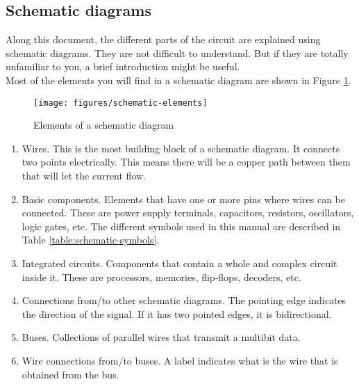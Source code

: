 \subsection{Schematic diagrams}

Along this document, the different parts of the circuit are explained using schematic diagrams. They are not difficult to understand. But if they are totally unfamiliar to you, a brief introduction might be useful. \\

Most of the elements you will find in a schematic diagram are shown in Figure \ref{fig:schematic-elements}.\\

\begin{figure}[h]
	\centering
	\texttt{[image: figures/schematic-elements]}
	\caption{Elements of a schematic diagram}
	\label{fig:schematic-elements}
\end{figure}

\begin{enumerate}
	\item Wires. This is the most building block of a schematic diagram. It connects two points electrically. This means there will be a copper path between them that will let the current flow. 
	\item Basic components. Elements that have one or more pins where wires can be connected. These are power supply terminals, capacitors, resistors, oscillators, logic gates, etc. The different symbols used in this manual are described in Table \ref{table:schematic-symbols}. 
	\item Integrated circuits. Components that contain a whole and complex circuit inside it. These are processors, memories, flip-flops, decoders, etc. 
	\item Connections from/to other schematic diagrams. The pointing edge indicates the direction of the signal. If it has two pointed edges, it is bidirectional. 
	\item Buses. Collections of parallel wires that transmit a multibit data. 
	\item Wire connections from/to buses. A label indicates what is the wire that is obtained from the bus. 
\end{enumerate}

